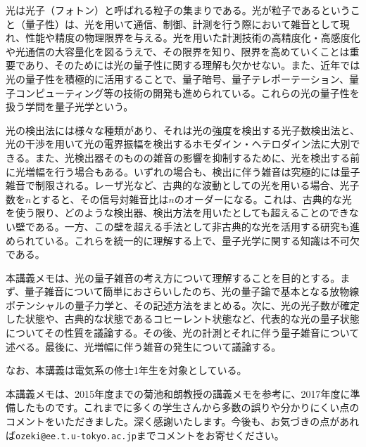 光は光子（フォトン）と呼ばれる粒子の集まりである。光が粒子であるということ（量子性）は、光を用いて通信、制御、計測を行う際において雑音として現れ、性能や精度の物理限界を与える。光を用いた計測技術の高精度化・高感度化や光通信の大容量化を図るうえで、その限界を知り、限界を高めていくことは重要であり、そのためには光の量子性に関する理解も欠かせない。また、近年では光の量子性を積極的に活用することで、量子暗号、量子テレポーテーション、量子コンピューティング等の技術の開発も進められている。これらの光の量子性を扱う学問を量子光学という。

光の検出法には様々な種類があり、それは光の強度を検出する光子数検出法と、光の干渉を用いて光の電界振幅を検出するホモダイン・ヘテロダイン法に大別できる。また、光検出器そのものの雑音の影響を抑制するために、光を検出する前に光増幅を行う場合もある。いずれの場合も、検出に伴う雑音は究極的には量子雑音で制限される。レーザ光など、古典的な波動としての光を用いる場合、光子数を$n$とすると、その信号対雑音比は$n$のオーダーになる。これは、古典的な光を使う限り、どのような検出器、検出方法を用いたとしても超えることのできない壁である。一方、この壁を超える手法として非古典的な光を活用する研究も進められている。これらを統一的に理解する上で、量子光学に関する知識は不可欠である。

本講義メモは、光の量子雑音の考え方について理解することを目的とする。まず、量子雑音について簡単におさらいしたのち、光の量子論で基本となる放物線ポテンシャルの量子力学と、その記述方法をまとめる。次に、光の光子数が確定した状態や、古典的な状態であるコヒーレント状態など、代表的な光の量子状態についてその性質を議論する。その後、光の計測とそれに伴う量子雑音について述べる。最後に、光増幅に伴う雑音の発生について議論する。

なお、本講義は電気系の修士1年生を対象としている。

本講義メモは、2015年度までの菊池和朗教授の講義メモを参考に、2017年度に準備したものです。これまでに多くの学生さんから多数の誤りや分かりにくい点のコメントをいただきました。深く感謝いたします。今後も、お気づきの点があれば\texttt{ozeki@ee.t.u-tokyo.ac.jp}までコメントをお寄せください。

